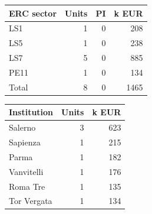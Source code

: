 \documentclass[11pt,a4paper]{article}
\begin{document}
{\footnotesize
\begin{longtable}{lrrr}
\toprule
ERC sector & Units & PI & k EUR \\
\midrule
\endhead
LS1 & 1 & 0 & 208 \\
LS5 & 1 & 0 & 238 \\
LS7 & 5 & 0 & 885 \\
PE11 & 1 & 0 & 134 \\
\midrule
Total & 8 & 0 & 1465 \\
\bottomrule
\end{longtable}
}
{\footnotesize
\begin{longtable}{lrr}
\toprule
Institution & Units & k EUR \\
\midrule
\endhead
Salerno & 3 & 623 \\
Sapienza & 1 & 215 \\
Parma & 1 & 182 \\
Vanvitelli & 1 & 176 \\
Roma Tre & 1 & 135 \\
Tor Vergata & 1 & 134 \\
\bottomrule
\end{longtable}
}
\end{document}

